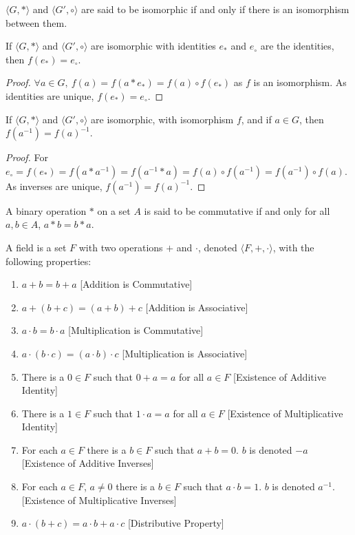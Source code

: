 \documentclass[crop=false,class=book,oneside]{standalone}
\begin{document}
        \begin{definition}
        $\langle G, *\rangle$ and $\langle G', \circ \rangle$ are said to be isomorphic if and only if there is an isomorphism between them.
        \end{definition}
        \begin{theorem}
        If $\langle G, * \rangle$ and $\langle G', \circ \rangle$ are isomorphic with identities $e_*$ and $e_{\circ}$ are the identities, then $f(e_*) = e_{\circ}$.
        \end{theorem}
        \begin{proof}
        $\forall a\in G,\ f(a)=f(a* e_*) = f(a)\circ f(e_*)$ as $f$ is an isomorphism. As identities are unique, $f(e_*) = e_{\circ}$.
        \end{proof}
        \begin{theorem}
        If $\langle G, * \rangle$ and $\langle G', \circ \rangle$ are isomorphic, with isomorphism $f$, and if $a\in G$, then $f(a^{-1}) = f(a)^{-1}$.
        \end{theorem}
        \begin{proof}
        For $e_{\circ}=f(e_*) = f(a*a^{-1}) = f(a^{-1}*a) = f(a)\circ f(a^{-1})=f(a^{-1})\circ f(a)$. As inverses are unique, $f(a^{-1})=f(a)^{-1}$.
        \end{proof}
        \begin{definition}
        A binary operation $*$ on a set $A$ is said to be commutative if and only for all $a,b\in A$, $a*b = b*a$.
        \end{definition}
        \begin{definition}
        A field is a set $F$ with two operations $+$ and $\cdot$, denoted $\langle F, +,\cdot \rangle$, with the following properties:
        \begin{enumerate}
        \item $a+b=b+a$ \hfill [Addition is Commutative]
        \item $a+(b+c)=(a+b)+c$ \hfill [Addition is Associative]
        \item $a\cdot b = b\cdot a$ \hfill [Multiplication is Commutative]
        \item $a\cdot (b\cdot c) = (a\cdot b)\cdot c$ \hfill [Multiplication is Associative]
        \item There is a $0\in F$ such that $0+a=a$ for all $a\in F$ \hfill [Existence of Additive Identity]
        \item There is a $1\in F$ such that $1\cdot a = a$ for all $a\in F$ \hfill [Existence of Multiplicative Identity]
        \item For each $a\in F$ there is a $b\in F$ such that $a+b = 0$. $b$ is denoted $-a$ \hfill [Existence of Additive Inverses]
        \item For each $a\in F$, $a\ne 0$ there is a $b\in F$ such that $a\cdot b = 1$. $b$ is denoted $a^{-1}$. \hfill [Existence of Multiplicative Inverses]
        \item $a\cdot(b+c) = a\cdot b + a\cdot c$ \hfill [Distributive Property]
        \end{enumerate}
        \end{definition}
\end{document}
